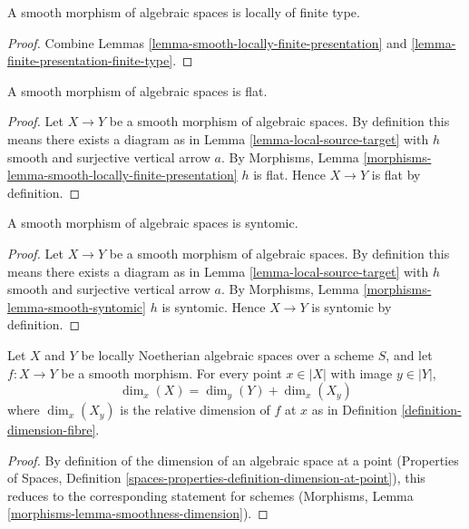 \begin{lemma}
\label{lemma-smooth-locally-finite-type}
A smooth morphism of algebraic spaces is locally of finite type.
\end{lemma}

\begin{proof}
Combine
Lemmas \ref{lemma-smooth-locally-finite-presentation} and
\ref{lemma-finite-presentation-finite-type}.
\end{proof}

\begin{lemma}
\label{lemma-smooth-flat}
A smooth morphism of algebraic spaces is flat.
\end{lemma}

\begin{proof}
Let $X \to Y$ be a smooth morphism of algebraic spaces. By
definition this means there exists a diagram as in
Lemma \ref{lemma-local-source-target}
with $h$ smooth and surjective vertical arrow $a$. By
Morphisms, Lemma \ref{morphisms-lemma-smooth-locally-finite-presentation}
$h$ is flat. Hence $X \to Y$ is flat by definition.
\end{proof}

\begin{lemma}
\label{lemma-smooth-syntomic}
A smooth morphism of algebraic spaces is syntomic.
\end{lemma}

\begin{proof}
Let $X \to Y$ be a smooth morphism of algebraic spaces. By
definition this means there exists a diagram as in
Lemma \ref{lemma-local-source-target}
with $h$ smooth and surjective vertical arrow $a$. By
Morphisms, Lemma \ref{morphisms-lemma-smooth-syntomic}
$h$ is syntomic. Hence $X \to Y$ is syntomic by definition.
\end{proof}

\begin{lemma}
\label{lemma-smoothness-dimension-spaces}
Let $X$ and $Y$ be locally Noetherian algebraic spaces over a scheme
$S$, and let $f : X \to Y$ be a smooth morphism.
For every point $x \in |X|$ with image $y \in |Y|$,
$$
\dim_x(X) = \dim_y(Y) + \dim_x(X_y)
$$
where $\dim_x(X_y)$ is the relative dimension of $f$ at $x$ as
in Definition \ref{definition-dimension-fibre}.
\end{lemma}

\begin{proof}
By definition of the dimension of an algebraic space
at a point (Properties of Spaces, Definition
\ref{spaces-properties-definition-dimension-at-point}),
this reduces to the corresponding statement for schemes
(Morphisms, Lemma \ref{morphisms-lemma-smoothness-dimension}).
\end{proof}



